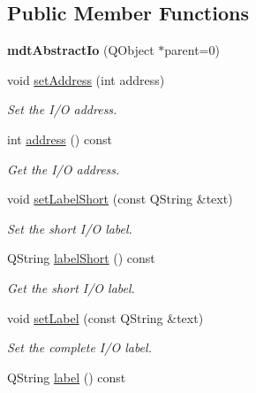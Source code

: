 \subsection*{Public Member Functions}
\begin{DoxyCompactItemize}
\item 
\hypertarget{classmdt_abstract_io_ac138b89890471e0412f2b15f2c53f1f9}{
{\bfseries mdtAbstractIo} (QObject $\ast$parent=0)}
\label{classmdt_abstract_io_ac138b89890471e0412f2b15f2c53f1f9}

\item 
\hypertarget{classmdt_abstract_io_a1f3bfa0472c7e0bd4cd9a5b865c460a2}{
void \hyperlink{classmdt_abstract_io_a1f3bfa0472c7e0bd4cd9a5b865c460a2}{setAddress} (int address)}
\label{classmdt_abstract_io_a1f3bfa0472c7e0bd4cd9a5b865c460a2}

\begin{DoxyCompactList}\small\item\em Set the I/O address. \end{DoxyCompactList}\item 
\hypertarget{classmdt_abstract_io_a52f071b6c1098e74f82eade9ead5382a}{
int \hyperlink{classmdt_abstract_io_a52f071b6c1098e74f82eade9ead5382a}{address} () const }
\label{classmdt_abstract_io_a52f071b6c1098e74f82eade9ead5382a}

\begin{DoxyCompactList}\small\item\em Get the I/O address. \end{DoxyCompactList}\item 
void \hyperlink{classmdt_abstract_io_a0f0a70927942f793ce93c7f0c013a39e}{setLabelShort} (const QString \&text)
\begin{DoxyCompactList}\small\item\em Set the short I/O label. \end{DoxyCompactList}\item 
\hypertarget{classmdt_abstract_io_ad6490f8dda6df55cc3d1811348d0155e}{
QString \hyperlink{classmdt_abstract_io_ad6490f8dda6df55cc3d1811348d0155e}{labelShort} () const }
\label{classmdt_abstract_io_ad6490f8dda6df55cc3d1811348d0155e}

\begin{DoxyCompactList}\small\item\em Get the short I/O label. \end{DoxyCompactList}\item 
void \hyperlink{classmdt_abstract_io_ae614f78829c59cb7b7d8265dd59e2164}{setLabel} (const QString \&text)
\begin{DoxyCompactList}\small\item\em Set the complete I/O label. \end{DoxyCompactList}\item 
\hypertarget{classmdt_abstract_io_a8d21d147ce526f9ad9f65bde7c68b7d9}{
QString \hyperlink{classmdt_abstract_io_a8d21d147ce526f9ad9f65bde7c68b7d9}{label} () const }
\label{classmdt_abstract_io_a8d21d147ce526f9ad9f65bde7c68b7d9}


\end{DoxyCompactItemize}
